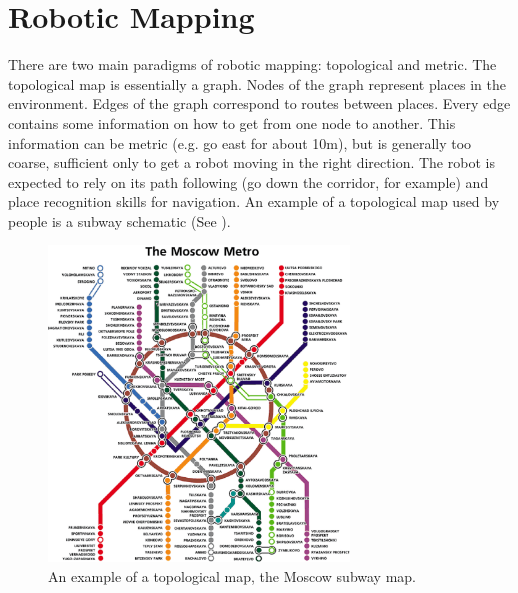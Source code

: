 
\nocite{psycho_tversky81}
\nocite{psycho_mcnamara86} 
\nocite{psycho_passini84}
\nocite{psycho_piaget60}

\section{Robotic Mapping}


There are two main paradigms of robotic mapping: topological and
metric. The topological map is essentially a graph.  Nodes of the
graph represent places in the environment. Edges of the graph
correspond to routes between places. Every edge contains some
information on how to get from one node to another. This information
can be metric (e.g. go east for about 10m), but is generally too
coarse, sufficient only to get a robot moving in the right direction.
The robot is expected to rely on its path following (go down the
corridor, for example) and place recognition skills for navigation. An
example of a topological map used by people is a subway schematic (See
).

\begin{figure}[h]
\begin{center}
\includegraphics[width=8cm]{Pics/subway_map}
\end{center}
\caption[Example topological map.]{An example of a topological map, the Moscow subway map.}
\label{fig:subway}
\end{figure}

